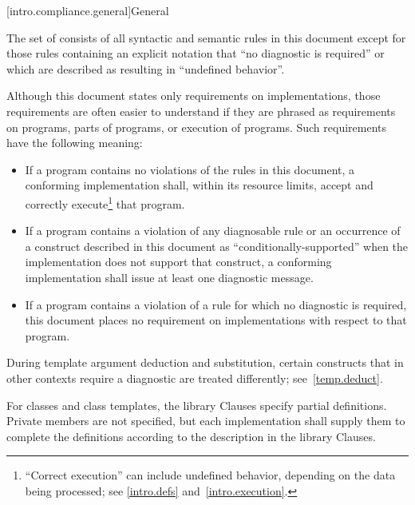 [intro.compliance.general]{General}

\pnum
{}%
%
The set of
consists of all syntactic and semantic rules in this document
except for those rules containing an explicit notation that
``no diagnostic is required'' or which are described as resulting in
``undefined behavior''.

\pnum
{}%
Although this document states only requirements on \Cpp{}
implementations, those requirements are often easier to understand if
they are phrased as requirements on programs, parts of programs, or
execution of programs. Such requirements have the following meaning:
\begin{itemize}
\item
If a program contains no violations of the rules in this
document, a conforming implementation shall,
within its resource limits, accept and correctly execute\footnote{``Correct execution'' can include undefined behavior, depending on
the data being processed; see \ref{intro.defs} and~\ref{intro.execution}.}
that program.
\item
{}%
If a program contains a violation of any diagnosable rule or an occurrence
of a construct described in this document as ``conditionally-supported'' when
the implementation does not support that construct, a conforming implementation
shall issue at least one diagnostic message.
\item
{}%
If a program contains a violation of a rule for which no diagnostic
is required, this document places no requirement on
implementations with respect to that program.
\end{itemize}
\begin{note}
During template argument deduction and substitution,
certain constructs that in other contexts require a diagnostic
are treated differently;
see~\ref{temp.deduct}.
\end{note}

\pnum
{}%
%
%
For classes and class templates, the library Clauses specify partial
definitions. Private members are not
specified, but each implementation shall supply them to complete the
definitions according to the description in the library Clauses.


